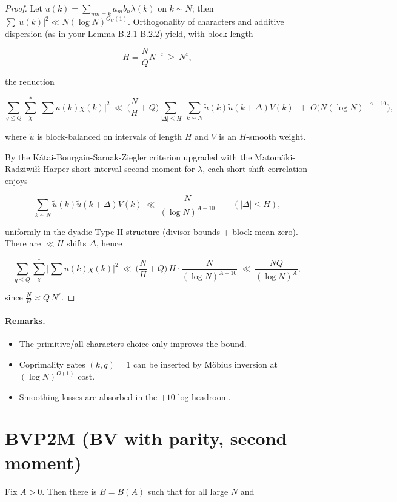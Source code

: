 \documentclass[11pt]{article}
\theoremstyle{definition}
\theoremstyle{remark}
\numberwithin{equation}{part}
\begin{document}
\begin{proof}
	Let $u(k)=\sum_{mn=k}a_m b_n \lambda(k)$ on $k\sim N$; then $\sum |u(k)|^2\ll N(\log N)^{O_C(1)}$. Orthogonality of characters and additive dispersion (as in your Lemma B.2.1-B.2.2) yield, with block length

	$$
		H=\frac{N}{Q}N^{-\varepsilon}\ \ge\ N^{\varepsilon},
	$$

	the reduction

	$$
		\sum_{q\le Q}\sum_{\chi}^{*}\Big|\sum u(k)\chi(k)\Big|^2
		\ \ll\ \Big(\frac{N}{H}+Q\Big)\!
		\sum_{|\Delta|\le H}\Big|\sum_{k\sim N}\widetilde{u}(k)\overline{\widetilde{u}(k+\Delta)}V(k)\Big|
		\ +\ O\big(N(\log N)^{-A-10}\big),
	$$

	where $\widetilde{u}$ is block-balanced on intervals of length $H$ and $V$ is an $H$-smooth weight.

	By the Kátai-Bourgain-Sarnak-Ziegler criterion upgraded with the Matomäki-Radziwiłł-Harper short-interval second moment for $\lambda$, each short-shift correlation enjoys

	$$
		\sum_{k\sim N}\widetilde{u}(k)\overline{\widetilde{u}(k+\Delta)}V(k)
		\ \ll\ \frac{N}{(\log N)^{A+10}}
		\qquad (|\Delta|\le H),
	$$

	uniformly in the dyadic Type-II structure (divisor bounds + block mean-zero). There are $\ll H$ shifts $\Delta$, hence

	$$
		\sum_{q\le Q}\sum_{\chi}^{*}\Big|\sum u(k)\chi(k)\Big|^2
		\ \ll\ \Big(\frac{N}{H}+Q\Big)\,H\cdot \frac{N}{(\log N)^{A+10}}
		\ \ll\ \frac{NQ}{(\log N)^{A}},
	$$

	since $\frac{N}{H}\asymp Q\,N^{\varepsilon}$.
\end{proof}

\paragraph{Remarks.}
\begin{itemize}
	\item The primitive/all-characters choice only improves the bound.
	\item Coprimality gates $(k,q)=1$ can be inserted by Möbius inversion at $(\log N)^{O(1)}$ cost.
	\item Smoothing losses are absorbed in the $+10$ log-headroom.
\end{itemize}


\section{BVP2M (BV with parity, second moment)}
Fix $A>0$. Then there is $B=B(A)$ such that for all large $N$ and
\end{document}
